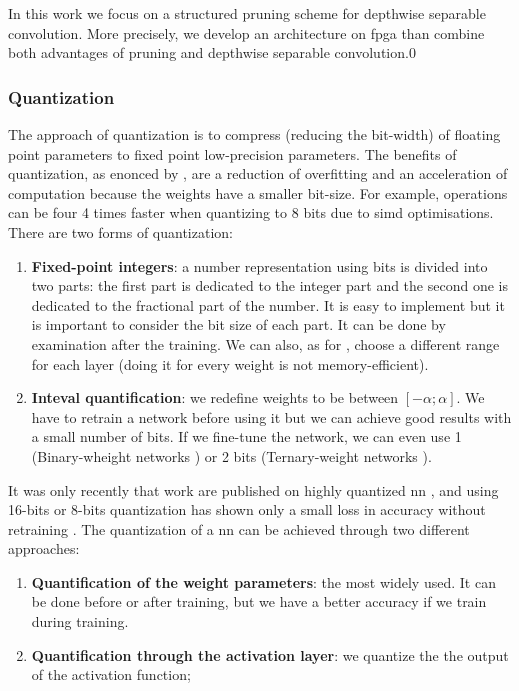 %
In this work we focus on a structured pruning scheme for depthwise separable convolution. More precisely, we develop an architecture on \acrshort{fpga} than combine both advantages of pruning and depthwise separable convolution.0
%
%
\subsubsection{Quantization} \label{subs:quantization}
The approach of quantization is to compress (reducing the bit-width) of floating point parameters to fixed point low-precision parameters. The benefits of quantization, as enonced by \cite{joos_de_ter_beerst_accelerating_2019}, are a reduction of overfitting and an acceleration of computation because the weights have a smaller bit-size. For example, operations can be four 4 times faster when quantizing to 8 bits due to \acrshort{simd} optimisations. \newline \newline
%
There are two forms of quantization:
\begin{enumerate}
    \item \textbf{Fixed-point integers}: a number representation using bits is divided into two parts: the first part is dedicated to the integer part and the second one is dedicated to the fractional part of the number. It is easy to implement but it is important to consider the bit size of each part. It can be done by examination after the training. We can also, as for \cite{qiu_going_2016, yin_high_2018}, choose a different range for each layer (doing it for every weight is not memory-efficient).
    \item \textbf{Inteval quantification}: we redefine weights to be between $[-\alpha; \alpha]$. We have to retrain a network before using it but we can achieve good results with a small number of bits. If we fine-tune the network, we can even use 1 (Binary-wheight networks \cite{courbariaux_binarized_2016}) or 2 bits (Ternary-weight networks \cite{li_ternary_2016}).
\end{enumerate}
%
It was only recently that work are published on highly quantized \acrshort{nn} \cite{guo_survey_2018}, and using 16-bits or 8-bits quantization has shown only a small loss in accuracy without retraining \cite{abdelouahab_accelerating_2018}. The quantization of a \acrshort{nn} can be achieved through two different approaches:
\begin{enumerate}
    \item \textbf{Quantification of the weight parameters}: the most widely used. It can be done before or after training, but we have a better accuracy if we train during training.
    \item \textbf{Quantification through the activation layer}: we quantize the the output of the activation function;
\end{enumerate}

